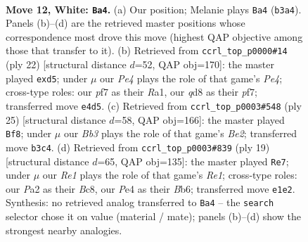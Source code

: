 \documentclass[11pt]{article}
\begin{document}
\clearpage

\begin{figure}[p]\centering
\begin{subfigure}{0.46\textwidth}\centering
\resizebox{\linewidth}{!}{%
\newchessgame
\chessboard[
  setfen={r1bq1rk1/2p2p2/1pn2np1/p1bpp2p/4P2P/1BPP1N2/PP1N1PP1/R1BQR1K1 w - - 0 12},
  showmover=false,
  pgfstyle=straightmove, color=movearrow, markmove={b3-a4}
]}
\caption{}
\end{subfigure}\hfill
\begin{subfigure}{0.46\textwidth}\centering
\resizebox{\linewidth}{!}{%
\newchessgame
\chessboard[
  setfen={r1bqr1k1/b1p2pp1/p1n2n1p/1p1pp3/P3P3/1BPP1N2/1P1N1PPP/R1BQR1K1 w - - 0 12},
  showmover=false,
  pgfstyle=straightmove, color=movearrow, markmove={e4-d5}
]}
\caption{}
\end{subfigure}
\\[4pt]
\begin{subfigure}{0.46\textwidth}\centering
\resizebox{\linewidth}{!}{%
\newchessgame
\chessboard[
  setfen={r1bqr1k1/3nbppp/p2p1n2/1pp1p3/3PP3/1BP2NNP/PP3PP1/R1BQR1K1 b - - 3 13},
  showmover=false,
  pgfstyle=straightmove, color=movearrow, markmove={e7-f8}
]}
\caption{}
\end{subfigure}\hfill
\begin{subfigure}{0.46\textwidth}\centering
\resizebox{\linewidth}{!}{%
\newchessgame
\chessboard[
  setfen={r1bqr1k1/pppn1pp1/1b1p1n1p/4p3/2BPP3/1QP2N1P/PP3PP1/RNB1R1K1 b - - 2 10},
  showmover=false,
  pgfstyle=straightmove, color=movearrow, markmove={e8-e7}
]}
\caption{}
\end{subfigure}
\caption{\textbf{Move 12, White: \texttt{Ba4}.} (a) Our position; Melanie plays \texttt{Ba4} (\texttt{b3a4}). Panels (b)--(d) are the retrieved master positions whose correspondence most drove this move (highest QAP objective among those that transfer to it). (b) Retrieved from \texttt{ccrl\_top\_p0000\#14} (ply 22) [structural distance $d$=52, QAP obj=170]: the master played \texttt{exd5}; under $\mu$ our \emph{Pe4} plays the role of that game's \emph{Pe4}; cross-type roles: our \emph{p}f7 as their \emph{R}a1, our \emph{q}d8 as their \emph{p}f7; transferred move \texttt{e4d5}. (c) Retrieved from \texttt{ccrl\_top\_p0003\#548} (ply 25) [structural distance $d$=58, QAP obj=166]: the master played \texttt{Bf8}; under $\mu$ our \emph{Bb3} plays the role of that game's \emph{Be2}; transferred move \texttt{b3c4}. (d) Retrieved from \texttt{ccrl\_top\_p0003\#839} (ply 19) [structural distance $d$=65, QAP obj=135]: the master played \texttt{Re7}; under $\mu$ our \emph{Re1} plays the role of that game's \emph{Re1}; cross-type roles: our \emph{P}a2 as their \emph{B}c8, our \emph{P}e4 as their \emph{B}b6; transferred move \texttt{e1e2}. Synthesis: no retrieved analog transferred to \texttt{Ba4} -- the \texttt{search} selector chose it on value (material / mate); panels (b)--(d) show the strongest nearby analogies.}
\label{fig:thought-m22}
\end{figure}
\end{document}
